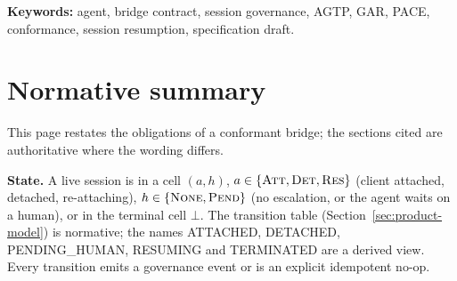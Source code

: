 \medskip
\noindent\textbf{Keywords:} agent, bridge contract, session governance, AGTP, GAR, PACE, conformance, session resumption, specification draft.

\section*{Normative summary}

This page restates the obligations of a conformant bridge; the sections
cited are authoritative where the wording differs.

\smallskip\noindent\textbf{State.} A live session is in a cell
$(a,h)$, $a \in \{\textsc{Att}, \textsc{Det}, \textsc{Res}\}$ (client
attached, detached, re-attaching), $h \in \{\textsc{None},
\textsc{Pend}\}$ (no escalation, or the agent waits on a human), or in the
terminal cell $\bot$. The transition table
(Section~\ref{sec:product-model}) is normative; the names ATTACHED,
DETACHED, PENDING\_HUMAN, RESUMING and TERMINATED are a derived view. Every
transition emits a governance event or is an explicit idempotent no-op.

